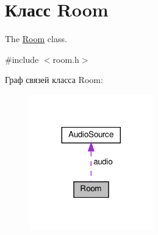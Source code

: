 \hypertarget{class_room}{}\section{Класс Room}
\label{class_room}


The \hyperlink{class_room}{Room} class.  




{\ttfamily \#include $<$room.\+h$>$}



Граф связей класса Room\+:\nopagebreak
\begin{figure}[H]
\begin{center}
\leavevmode
\includegraphics[width=152pt]{class_room__coll__graph}
\end{center}
\end{figure}
